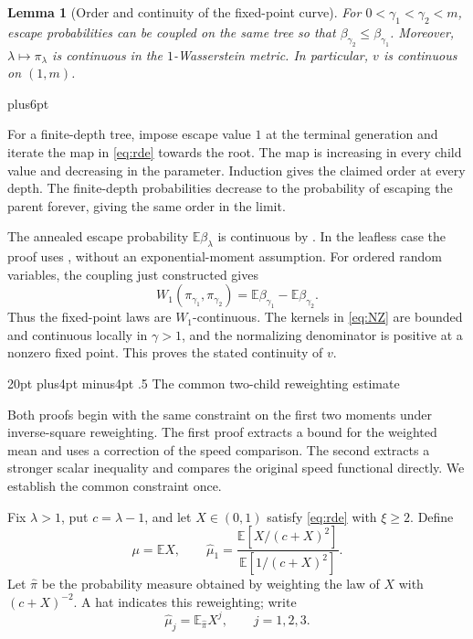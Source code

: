 \documentclass[11pt,reqno]{amsart}
\makeatletter
\def\section{\@startsection{section}{1}{0pt}%
  {20pt plus4pt minus4pt}
  {.5\linespacing}
  {\normalfont\bfseries}}
\theoremstyle{plain}
\newtheorem{lemma}[theorem]{Lemma}
\theoremstyle{definition}
\theoremstyle{remark}
\renewenvironment{proof}[1][\proofname]{%
  \par
  \pushQED{\qed}%
  \normalfont
  \topsep6pt plus6pt\relax
  \trivlist
  \item[\hskip\labelsep\slshape #1\@addpunct{.}]%
  \ignorespaces
}{%
  \popQED
  \endtrivlist
  \@endpefalse
}
\DeclareRobustCommand{\qed}{%
  \leavevmode\unskip\penalty9999\hbox{}\nobreak
  \ifmmode
    \makebox[0pt][l]{\qquad\hbox{\qedsymbol}}%
  \else
    \qquad\hbox{\qedsymbol}%
  \fi
}
\renewcommand{\qedsymbol}{\rule[.47pt]{4pt}{6pt}}
\numberwithin{equation}{section}
\newcommand{\E}{\mathbb E}
\makeatother
\begin{document}
\begin{lemma}[Order and continuity of the fixed-point curve]\label{lem:continuity}
For $0<\gamma_1<\gamma_2<m$, escape probabilities can be coupled on the same tree
so that $\beta_{\gamma_2}\le\beta_{\gamma_1}$. Moreover,
$\lambda\mapsto\pi_\lambda$ is continuous in the $1$-Wasserstein metric.
In particular, $v$ is continuous on $(1,m)$.
\end{lemma}

\begin{proof}
For a finite-depth tree, impose escape value $1$ at the terminal generation
and iterate the map in \eqref{eq:rde} towards the root. The map is increasing
in every child value and decreasing in the parameter. Induction gives the
claimed order at every depth. The finite-depth probabilities decrease to
the probability of escaping the parent forever, giving the same order in
the limit.

The annealed escape probability $\E\beta_\lambda$ is continuous by
\cite[Proposition~2.9]{BT}. In the leafless case the proof uses
\cite[Lemma~4.7]{BT}, without an exponential-moment assumption. For ordered
random variables, the coupling just constructed gives
\begin{equation}\label{eq:W1}
 W_1(\pi_{\gamma_1},\pi_{\gamma_2})
 =\E\beta_{\gamma_1}-\E\beta_{\gamma_2}.
\end{equation}
Thus the fixed-point laws are $W_1$-continuous. The kernels in
\eqref{eq:NZ} are bounded and continuous locally in $\gamma>1$, and the
normalizing denominator is positive at a nonzero fixed point. This proves
the stated continuity of $v$.
\end{proof}

\section{The common two-child reweighting estimate}\label{sec:tilt}

Both proofs begin with the same constraint on the first two moments
under inverse-square reweighting. The first proof extracts a bound for
the weighted mean and uses a correction of the speed comparison. The
second extracts a stronger scalar inequality and compares the original
speed functional directly. We establish the common constraint once.

Fix $\lambda>1$, put $c=\lambda-1$, and let $X\in(0,1)$ satisfy
\eqref{eq:rde} with $\xi\ge2$. Define
\begin{equation}\label{eq:mu-k}
 \mu=\E X,\qquad
 \widehat\mu_1=\frac{\E[X/(c+X)^2]}{\E[1/(c+X)^2]}.
\end{equation}
Let $\widehat\pi$ be the probability measure obtained by weighting the
law of $X$ with $(c+X)^{-2}$. A hat indicates this reweighting; write
\begin{equation}\label{eq:tilted-moments}
 \widehat\mu_j=\E_{\widehat\pi}X^j,\qquad j=1,2,3.
\end{equation}
\end{document}
